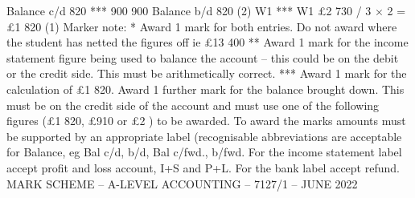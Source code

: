 \documentclass{article}
\begin{document}
Balance c/d  820 *** \newline
 \newline
    \newline
  900 \newline
    900   \newline
 \newline
  \newline
  \newline
Balance b/d  820 (2) W1 *** \newline
 \newline
W1  \newline
£2 730 / 3 × 2 = £1 820 (1) \newline
 \newline
Marker note: \newline
 \newline
* Award 1 mark for both entries.  Do not award where the student has netted the figures off ie £13 400 \newline
** Award 1 mark for the income statement figure being used to balance the account – this could be on \newline
the debit or the credit side.  This must be arithmetically correct. \newline
*** Award 1 mark for the calculation of £1 820.  Award 1 further mark for the balance brought down.  This \newline
must be on the credit side of the account and must use one of the following figures (£1 820, £910 or £2 ) to be awarded. \newline
 \newline
To award the marks amounts must be supported by an appropriate label (recognisable abbreviations are \newline
acceptable for Balance, eg Bal c/d, b/d, Bal c/fwd., b/fwd. For the income statement label accept profit \newline
and loss account, I+S and P+L. For the bank label accept refund.  \newline
 \newline
 \newline
 \newline
MARK SCHEME – A-LEVEL ACCOUNTING – 7127/1 – JUNE 2022  \newline
\end{document}
